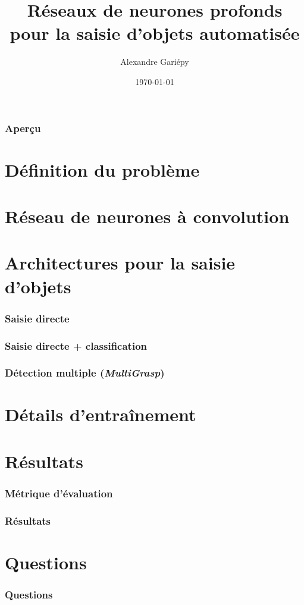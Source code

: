 \documentclass{beamer}
\title[Réseaux de neurones pour saisie automatique]{Réseaux de neurones profonds pour la saisie d'objets automatisée}
\author{Alexandre Gariépy}
\institute[ulaval] 
{
Université Laval \\
\medskip
\textit{alexandre.gariepy.2@ulaval.ca}
}
\date{\today}
\begin{document}
\begin{frame}
\titlepage
\end{frame}

\begin{frame}
\frametitle{Aperçu}
\tableofcontents 
\end{frame}

\section{Définition du problème}

\section{Réseau de neurones à convolution}

\section{Architectures pour la saisie d'objets}
\begin{frame}
  \frametitle{Saisie directe}
  
\end{frame}

\begin{frame}
  \frametitle{Saisie directe + classification}

\end{frame}
\begin{frame}
  \frametitle{Détection multiple (\emph{MultiGrasp})}
  
\end{frame}


\section{Détails d'entraînement}

\section{Résultats}
\begin{frame}
  \frametitle{Métrique d'évaluation}
  
\end{frame}

\begin{frame}
  \frametitle{Résultats}
  
\end{frame}

\section{Questions}
\begin{frame}
  \frametitle{Questions}
  
\end{frame}
\end{document}
